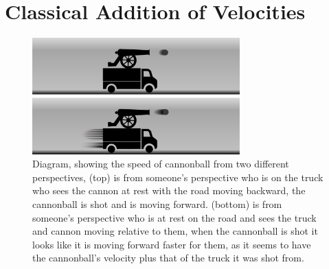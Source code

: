 



\section{Classical Addition of Velocities}\label{Section classical velocity addition}

\begin{figure}[ht]
	\centering
	\includegraphics[width=8cm]{images/pdf/lorry_cannonball.pdf}
	\caption{Diagram, showing the speed of cannonball from two different perspectives, (top) is from someone's perspective who is on the truck who sees the cannon at rest with the road moving backward, the cannonball is shot and is moving forward. (bottom) is from someone's perspective who is at rest on the road and sees the truck and cannon moving relative to them, when the cannonball is shot it looks like it is moving forward faster for them, as it seems to have the cannonball's velocity plus that of the truck it was shot from.}
	\label{fig: truck cannonball}
\end{figure}

